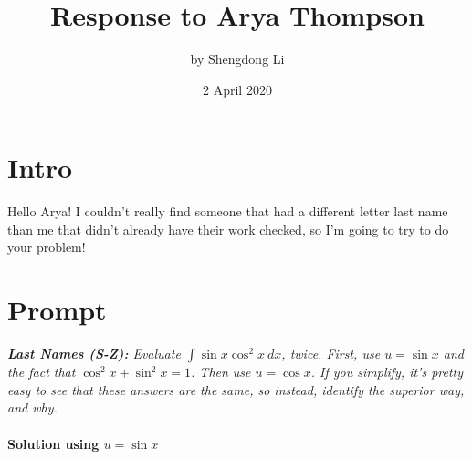\documentclass[letterpaper,12pt]{article}
\begin{document}
\title{Response to Arya Thompson}
\author{by Shengdong Li}
\date{2 April 2020}
\maketitle

\section{Intro}
Hello Arya!
I couldn't really find someone that had a different letter last name than me that didn't already have their work checked, so I'm going to try to do your problem!
\section{Prompt}
\textit{
    \textbf{Last Names (S-Z):}
    Evaluate $\int\sin x\cos^2 x\:dx$, twice. First, use $u = \sin x$ and the fact that $\cos^2 x+\sin^2 x=1$. Then use $u=\cos x$. If you simplify, it's pretty easy to see that these answers are the same, so instead, identify the superior way, and why.
}
\textbf{
    \\~\\ Solution using $u = \sin x$
}
\end{document}
